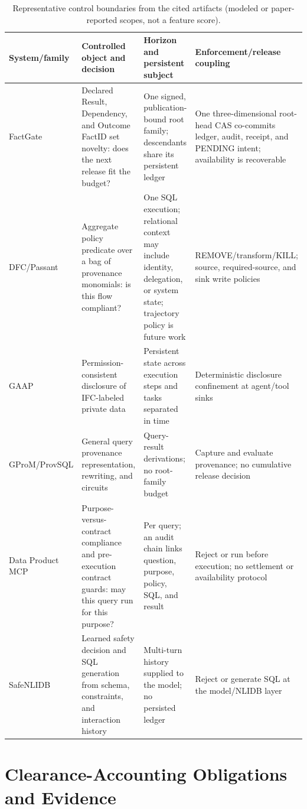\documentclass[journal,onecolumn]{IEEEtran}
\begin{document}
\begin{table}[h]
\centering
\caption{Representative control boundaries from the cited artifacts (modeled
or paper-reported scopes, not a feature score).}
\label{tab:system-comparison}
\scriptsize
\setlength{\tabcolsep}{2pt}
\renewcommand{\arraystretch}{1.0}
\begin{tabular}{L{0.13\textwidth}L{0.27\textwidth}L{0.25\textwidth}L{0.25\textwidth}}
\toprule
System/family & Controlled object and decision & Horizon and persistent subject & Enforcement/release coupling \\
\midrule
FactGate & Declared Result, Dependency, and Outcome FactID set novelty:
does the next release fit the budget? & One signed, publication-bound root
family; descendants share its persistent ledger & One three-dimensional
root-head CAS co-commits ledger, audit, receipt, and PENDING intent; availability
is recoverable \\
DFC/Passant & Aggregate policy
predicate over a bag of provenance monomials: is this flow compliant? & One
SQL execution; relational context may include identity, delegation, or system
state; trajectory policy is future work & REMOVE/transform/KILL; source,
required-source, and sink write policies \\
GAAP & Permission-consistent disclosure of IFC-labeled
private data & Persistent state across execution steps and tasks separated in
time & Deterministic disclosure confinement at agent/tool sinks \\
GProM/ProvSQL & General query provenance representation, rewriting, and circuits & Query-result
derivations; no root-family budget & Capture and evaluate provenance; no
cumulative release decision \\
Data Product MCP & Purpose-versus-contract
compliance and pre-execution contract guards: may this query run for this
purpose? & Per query; an audit chain links question, purpose, policy, SQL, and
result & Reject or run before execution; no settlement or availability
protocol \\
SafeNLIDB & Learned safety decision and SQL generation
from schema, constraints, and interaction history & Multi-turn history
supplied to the model; no persisted ledger & Reject or generate SQL at the
model/NLIDB layer \\
\bottomrule
\end{tabular}
\end{table}

\section{Clearance-Accounting Obligations and Evidence}
\label{sec:supp-clearance-accounting}
\end{document}
